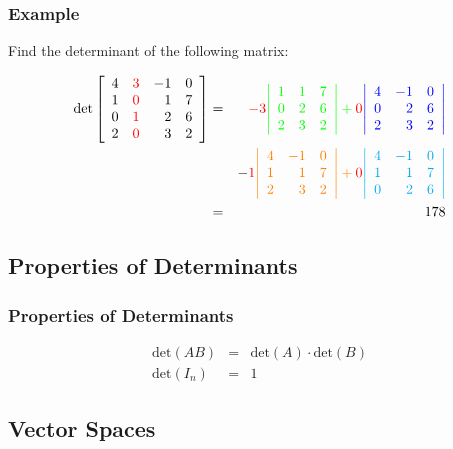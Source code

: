 \begin{frame}
  \frametitle{Example}

  Find the determinant of the following matrix:

  \begin{eqnarray*}
    \mathrm{det}
    \left[ \begin{array}{rrrr}
    4 & {\color{red}3} & -1 & 0 \\ 
    1 & {\color{red}0} & 1 & 7 \\ 
    0 & {\color{red}1} & 2 & 6 \\ 
    2 & {\color{red}0} & 3 & 2 \\ 
    \end{array} \right]
    & = &
    {\color{red}-3} \color{green}{ \left| \begin{array}{rrr} 1 & 1 & 7 \\ 0 & 2 & 6 \\ 2 & 3 & 2 \end{array} \right| }
    + {\color{red}0} \color{blue}{ \left| \begin{array}{rrr} 4 & -1 & 0 \\ 0 & 2 & 6 \\ 2 & 3 & 2 \end{array} \right| } \\
    & &
    - {\color{red}1} \color{orange}{ \left| \begin{array}{rrr} 4 & -1 & 0 \\ 1 & 1 & 7 \\ 2 & 3 & 2 \end{array} \right| }
    + {\color{red}0} \color{cyan}{ \left| \begin{array}{rrr} 4 & -1 & 0 \\ 1 & 1 & 7 \\ 0 & 2 & 6 \end{array} \right| } \\
    & = & 178
  \end{eqnarray*}


\end{frame}

\subsection{Properties of Determinants}

\begin{frame}
  \frametitle{Properties of Determinants}

  \begin{eqnarray*}
    \mathrm{det}(AB) & = & \mathrm{det}(A) \cdot \mathrm{det}(B) \\
    \mathrm{det}(I_n) & = & 1
  \end{eqnarray*}



\end{frame}


\subsection{Vector Spaces}

